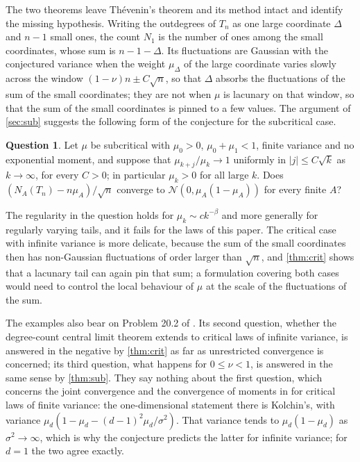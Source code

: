 \documentclass[11pt]{amsart}
\theoremstyle{definition}
\newtheorem{question}[theorem]{Question}
\newcommand{\Nor}{\mathcal{N}}
\begin{document}
The two theorems leave Th\'evenin's theorem and its method intact and identify the missing hypothesis. Writing the outdegrees of $T_n$ as one large coordinate $\Delta$ and $n-1$ small ones, the count $N_1$ is the number of ones among the small coordinates, whose sum is $n-1-\Delta$. Its fluctuations are Gaussian with the conjectured variance when the weight $\mu_\Delta$ of the large coordinate varies slowly across the window $(1-\nu)n\pm C\sqrt n$, so that $\Delta$ absorbs the fluctuations of the sum of the small coordinates; they are not when $\mu$ is lacunary on that window, so that the sum of the small coordinates is pinned to a few values. The argument of \cref{sec:sub} suggests the following form of the conjecture for the subcritical case.

\begin{question}
Let $\mu$ be subcritical with $\mu_0>0$, $\mu_0+\mu_1<1$, finite variance and no exponential moment, and suppose that $\mu_{k+j}/\mu_k\to1$ uniformly in $|j|\le C\sqrt k$ as $k\to\infty$, for every $C>0$; in particular $\mu_k>0$ for all large $k$. Does $(N_A(T_n)-n\mu_A)/\sqrt n$ converge to $\Nor(0,\mu_A(1-\mu_A))$ for every finite $A$?
\end{question}

The regularity in the question holds for $\mu_k\sim ck^{-\beta}$ and more generally for regularly varying tails, and it fails for the laws of this paper. The critical case with infinite variance is more delicate, because the sum of the small coordinates then has non-Gaussian fluctuations of order larger than $\sqrt n$, and \cref{thm:crit} shows that a lacunary tail can again pin that sum; a formulation covering both cases would need to control the local behaviour of $\mu$ at the scale of the fluctuations of the sum.

The examples also bear on Problem 20.2 of \cite{Janson12}. Its second question, whether the degree-count central limit theorem extends to critical laws of infinite variance, is answered in the negative by \cref{thm:crit} as far as unrestricted convergence is concerned; its third question, what happens for $0\le\nu<1$, is answered in the same sense by \cref{thm:sub}. They say nothing about the first question, which concerns the joint convergence and the convergence of moments in \cite[(20.7)--(20.9)]{Janson12} for critical laws of finite variance: the one-dimensional statement there is Kolchin's, with variance $\mu_d(1-\mu_d-(d-1)^2\mu_d/\sigma^2)$. That variance tends to $\mu_d(1-\mu_d)$ as $\sigma^2\to\infty$, which is why the conjecture predicts the latter for infinite variance; for $d=1$ the two agree exactly.
\end{document}
